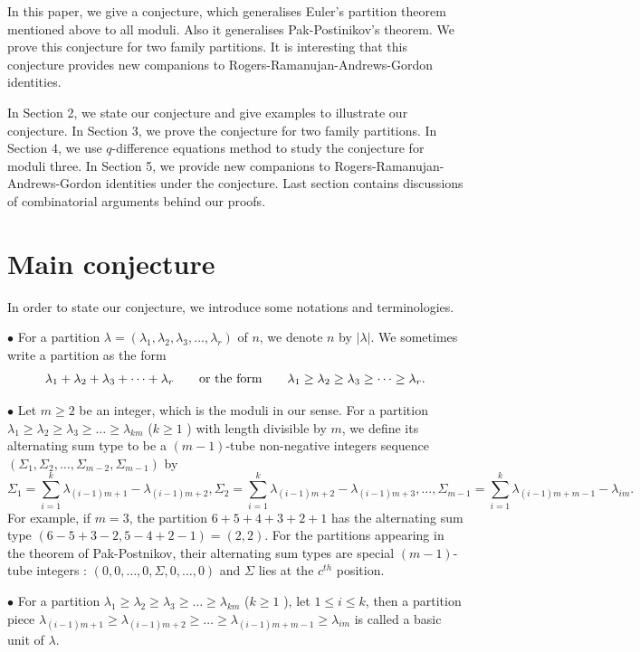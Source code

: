 \documentclass[draft]{amsart}
\numberwithin{equation}{section}
\theoremstyle{plain}
\theoremstyle{remark}
\begin{document}
In this paper, we give a conjecture, which generalises Euler's partition theorem mentioned above to all moduli. Also it generalises 
Pak-Postinikov's theorem. We prove this conjecture for two family partitions.  It is interesting that this conjecture provides new companions to Rogers-Ramanujan-Andrews-Gordon identities. 
 
In Section 2, we state our conjecture and give examples to illustrate our conjecture. In Section 3, we prove the conjecture for two family partitions. In Section 4, we use $q$-difference equations method to study the conjecture for moduli three. In Section 5, we provide new companions to Rogers-Ramanujan-Andrews-Gordon identities under the conjecture. Last section contains discussions of combinatorial arguments behind our proofs. 



\section{Main conjecture}
In order to state our conjecture, we introduce some notations and terminologies.

$\bullet$  For a partition $\lambda=(\lambda_1,\lambda_2, \lambda_{3},\dots,\lambda_{r})$ of $n$, we denote $n$ by $|\lambda |.$ We sometimes write a partition as the form
$$\lambda_1+\lambda_2+\lambda_3+\dots+\lambda_{r}  \quad \mbox{\quad or the form\quad} \quad   \lambda_1\geq\lambda_2\geq\lambda_{3}\geq\dots\geq\lambda_{r}.$$

$\bullet$ Let $m\geq 2$ be an integer, which is the moduli in our sense.  For a partition $\lambda_1\geq\lambda_2\geq\lambda_{3}\geq\dots\geq \lambda_{km}$ ($k\geq1$ ) with length divisible by $m$, we define its alternating sum type to be a $(m-1)$-tube non-negative integers sequence  $(\Sigma_{1},  \Sigma_{2},  \dots, \Sigma_{m-2},  \Sigma_{m-1})$ by
$$
\Sigma_{1}=\sum_{i=1}^{k}\lambda_{(i-1)m+1}-\lambda_{(i-1)m+2}, \Sigma_{2}=\sum_{i=1}^{k}\lambda_{(i-1)m+2}-\lambda_{(i-1)m+3}, \dots, \Sigma_{m-1}=\sum_{i=1}^{k}\lambda_{(i-1)m+m-1}-\lambda_{im}.
$$
For example, if $m=3$, the partition $6+5+4+3+2+1$ has the alternating sum type $(6-5+3-2,5-4+2-1)=(2, 2)$. For the partitions appearing in the theorem of Pak-Postnikov, their alternating sum types are special $(m-1)$-tube integers : $(0,0,\dots,0, \Sigma, 0,\dots,0)$ and $\Sigma$ lies at the $c^{th}$ position.


$\bullet$ For a partition $\lambda_1\geq\lambda_2\geq\lambda_{3}\geq\dots\geq \lambda_{km}$ ($k\geq1$ ),
let $1 \leq i\leq k$, then a partition piece $\lambda_{(i-1)m+1}\geq \lambda_{(i-1)m+2}\geq \dots\geq \lambda_{(i-1)m+m-1}\geq \lambda_{im}$ is called a basic unit of $\lambda$.
\end{document}
